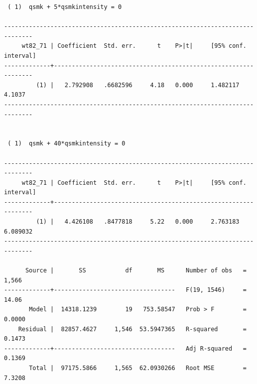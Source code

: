 \documentclass[
  10pt,
  a4paper,
]{book}
\begin{document}
\begin{verbatim}
 ( 1)  qsmk + 5*qsmkintensity = 0

------------------------------------------------------------------------------
     wt82_71 | Coefficient  Std. err.      t    P>|t|     [95% conf. interval]
-------------+----------------------------------------------------------------
         (1) |   2.792908   .6682596     4.18   0.000     1.482117      4.1037
------------------------------------------------------------------------------


 ( 1)  qsmk + 40*qsmkintensity = 0

------------------------------------------------------------------------------
     wt82_71 | Coefficient  Std. err.      t    P>|t|     [95% conf. interval]
-------------+----------------------------------------------------------------
         (1) |   4.426108   .8477818     5.22   0.000     2.763183    6.089032
------------------------------------------------------------------------------

      Source |       SS           df       MS      Number of obs   =     1,566
-------------+----------------------------------   F(19, 1546)     =     14.06
       Model |  14318.1239        19   753.58547   Prob > F        =    0.0000
    Residual |  82857.4627     1,546  53.5947365   R-squared       =    0.1473
-------------+----------------------------------   Adj R-squared   =    0.1369
       Total |  97175.5866     1,565  62.0930266   Root MSE        =    7.3208


\end{verbatim}
\end{document}
